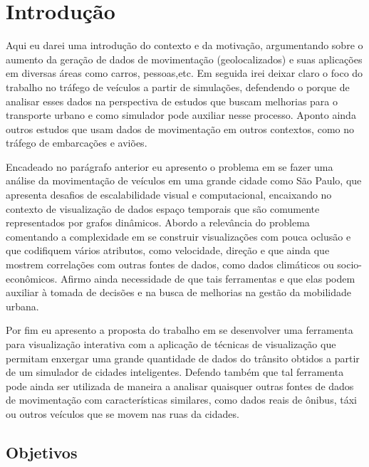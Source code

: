 \chapter{Introdução}
\label{cap:introducao}

Aqui eu darei uma introdução do contexto e da motivação, argumentando sobre o aumento da geração de dados de
movimentação (geolocalizados) e suas aplicações em diversas áreas como carros,
pessoas,etc. Em seguida irei deixar claro o foco do trabalho no tráfego de veículos a
partir de simulações, defendendo o porque de analisar esses dados na
perspectiva de estudos que buscam melhorias para o transporte urbano e como simulador
pode auxiliar nesse processo. Aponto ainda outros estudos que usam dados de
movimentação em outros contextos, como no tráfego de embarcações e aviões.

Encadeado no parágrafo anterior eu apresento o problema em se fazer
uma análise da movimentação de veículos em uma grande cidade como São Paulo, que apresenta
desafios de escalabilidade visual e computacional, encaixando no contexto de visualização de dados
espaço temporais que são comumente representados por grafos dinâmicos. Abordo a relevância
do problema comentando a complexidade em se construir visualizações com pouca oclusão
e que codifiquem vários atributos, como velocidade, direção e que ainda que mostrem
correlações com outras fontes de dados, como dados climáticos ou socio-econômicos. 
Afirmo ainda  necessidade de que tais ferramentas e que elas podem auxiliar à tomada
de decisões e na busca de melhorias na gestão da mobilidade urbana.

Por fim eu apresento a proposta do trabalho em se
desenvolver uma ferramenta para visualização interativa com a aplicação de técnicas de
visualização que permitam enxergar uma grande quantidade de dados do trânsito
obtidos a partir de um simulador de cidades inteligentes. Defendo também que tal
ferramenta pode ainda ser utilizada de maneira a analisar quaisquer outras fontes
de dados de movimentação com características similares, como dados
reais de ônibus, táxi ou outros veículos que se movem nas ruas da cidades.

\section{Objetivos}
\label{sec:objetivos}

